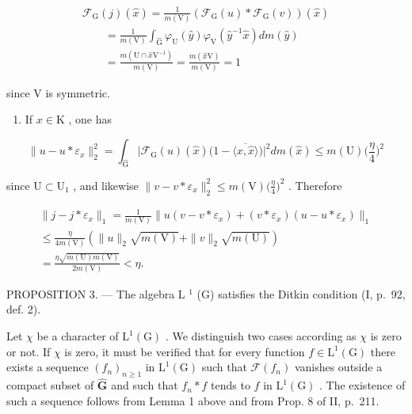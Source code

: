 \[
\begin{array}{l} \mathcal {F} _ {\mathrm{G}} (j) (\widehat {x}) = \frac {1}{m (\mathrm{V})} (\mathcal {F} _ {\mathrm{G}} (u) * \mathcal {F} _ {\mathrm{G}} (v)) (\widehat {x}) \\ \qquad = \frac {1}{m (\mathrm{V})} \int_ {\widehat {\mathrm{G}}} \varphi_ {\mathrm{U}} (\widehat {y}) \varphi_ {\mathrm{V}} (\widehat {y} ^ {- 1} \widehat {x}) d m (\widehat {y}) \\ \qquad = \frac {m (\mathrm{U} \cap \widehat {x} \mathrm{V} ^ {- 1})}{m (\mathrm{V})} = \frac {m (\widehat {x} \mathrm{V})}{m (\mathrm{V})} = 1 \end{array}
\]

since V is symmetric.

\begin{enumerate}
\def\labelenumi{\alph{enumi})}
\setcounter{enumi}{2}
\tightlist
\item
  If \(x \in \mathrm{K}\) , one has
\end{enumerate}

\[
\| u - u * \varepsilon_ {x} \| _ {2} ^ {2} = \int_ {\widehat {\mathrm{G}}} \big | \mathcal {F} _ {\mathrm{G}} (u) (\widehat {x}) \big (1 - \overline {{\langle x , \widehat {x} \rangle}} \big) \big | ^ {2} d m (\widehat {x}) \leqslant m (\mathrm{U}) \Big (\frac {\eta}{4} \Big) ^ {2}
\]

since \(\mathrm{U}\subset \mathrm{U}_1\) , and likewise \(\| v - v*\varepsilon_x\| _2^2\leqslant m(\mathrm{V})\big(\frac{\eta}{4}\big)^2\) . Therefore

\[
\begin{array}{l} \| j - j * \varepsilon_ {x} \| _ {1} = \frac {1}{m (\mathrm{V})} \| u (v - v * \varepsilon_ {x}) + (v * \varepsilon_ {x}) (u - u * \varepsilon_ {x}) \| _ {1} \\ \leqslant \frac {\eta}{4 m (\mathrm{V})} (\| u \| _ {2} \sqrt {m (\mathrm{V})} + \| v \| _ {2} \sqrt {m (\mathrm{U})}) \\ = \frac {\eta \sqrt {m (\mathrm{U}) m (\mathrm{V})}}{2 m (\mathrm{V})} <   \eta . \end{array}
\]

PROPOSITION 3. --- The algebra L \(^{1}\) (G) satisfies the Ditkin condition (I, p.~92, def. 2).

Let \(\chi\) be a character of \(\mathrm{L}^1 (\mathrm{G})\) . We distinguish two cases according as \(\chi\) is zero or not. If \(\chi\) is zero, it must be verified that for every function \(f\in \mathrm{L}^{1}(\mathrm{G})\) there exists a sequence \((f_n)_{n\geqslant 1}\) in \(\mathrm{L}^1 (\mathrm{G})\) such that \(\mathcal{F}(f_n)\) vanishes outside a compact subset of \(\widehat{\mathbf{G}}\) and such that \(f_{n}*f\) tends to \(f\) in \(\mathrm{L}^1 (\mathrm{G})\) . The existence of such a sequence follows from Lemma 1 above and from Prop. 8 of II, p.~211.

